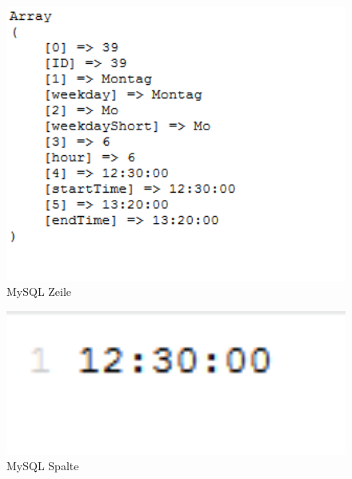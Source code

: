 \begin{figure}[H]
\centering
\includegraphics[keepaspectratio=true, width=14cm]{images/screenshots/content_mysql_fetch_row.png}
\caption{MySQL Zeile}
\label{fig:content_mysql_fetch_row}
\end{figure}
\begin{figure}[H]
\centering
\includegraphics[keepaspectratio=true, width=14cm]{images/screenshots/content_mysql_fetch_column.png}
\caption{MySQL Spalte}
\label{fig:content_mysql_fetch_column}
\end{figure}